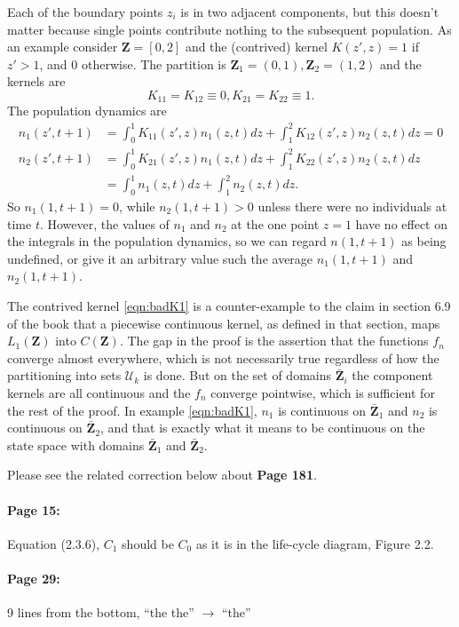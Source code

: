 \documentclass[12pt]{article}
\numberwithin{Box}{section}
\def\Z{\mathbf{Z}}
\newcommand{\be}{\begin{equation}}
\newcommand{\ee}{\end{equation}}
\newcommand{\ba}{\begin{equation} \begin{aligned}}
\newcommand{\ea}{\end{aligned} \end{equation}}
\begin{document}
Each of the boundary points $z_i$ is in two adjacent components, but this doesn't matter because  
single points contribute nothing to the subsequent population. 
As an example consider  $\Z = [0,2]$ and the (contrived) kernel $K(z',z) = 1$ 
if $z'>1$, and 0 otherwise. The partition is $\Z_1 = (0,1), \Z_2 = (1,2)$ and the kernels are 
\be
K_{11}=K_{12}\equiv 0, K_{21}=K_{22}\equiv 1.
\ee
The population dynamics are 
\ba
n_1(z',t+1) & = \int_0^1 K_{11}(z',z) n_1(z,t) dz + \int_1^2 K_{12}(z',z) n_2(z,t) dz  = 0 \\
n_2(z',t+1) & = \int_0^1 K_{21}(z',z) n_1(z,t) dz + \int_1^2 K_{22}(z',z) n_2(z,t) dz  \\
& =  \int_0^1 n_1(z,t) dz + \int_1^2 n_2(z,t) dz.  
\label{eqn:badK1}
\ea
So $n_1(1,t+1)=0$, while $n_2(1,t+1)>0$ unless there were no individuals at time $t$. 
However, the values of $n_1$ and $n_2$ at the one point $z=1$ have no effect on the
integrals in the population dynamics, so we can regard $n(1,t+1)$ as being undefined,
or give it an arbitrary value such the average $n_1(1,t+1)$ and $n_2(1,t+1)$. 

The contrived kernel \eqref{eqn:badK1} is a counter-example to the claim in section 6.9 of the book 
that a piecewise continuous kernel, as defined in that section, maps $L_1(\Z)$ into $C(\Z)$. 
The gap in the proof is the assertion that the functions $f_n$ converge almost everywhere, 
which is not necessarily true regardless of how the partitioning into sets $\mathcal{U}_k$ is done. But on the 
set of domains $\bar{\Z}_{i}$ the component kernels are all continuous and the $f_n$ converge 
pointwise, which is sufficient for the rest of the proof. 
In example \eqref{eqn:badK1}, $n_1$ is continuous on $\bar{\Z}_1$ and 
$n_2$ is continuous on $\bar{\Z}_2$, and that is exactly what it means to be continuous
on the state space with domains $\bar{\Z}_1$ and $\bar{\Z}_2$.  

Please see the related correction below about \textbf{Page 181}. 

\paragraph{Page 15:} Equation (2.3.6), $C_1$ should be $C_0$ as it is in the life-cycle diagram, Figure 2.2. 

\paragraph{Page 29:} 9 lines from the bottom, ``the the'' $\to$ ``the''
\end{document}
